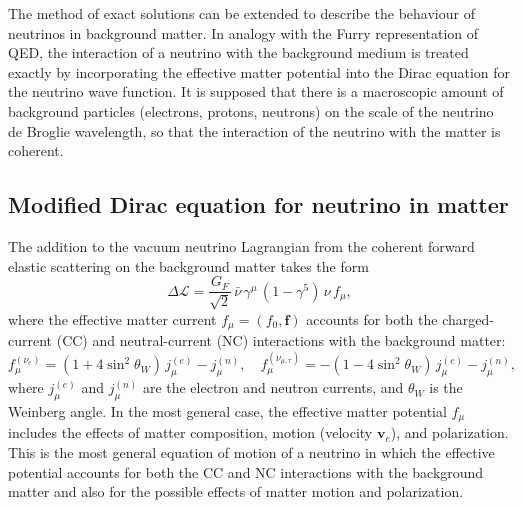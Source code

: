 \documentclass[a4paper,11pt]{article}
\begin{document}
The method of exact solutions can be extended to describe the behaviour of neutrinos in background matter. In analogy with the Furry representation of QED, the interaction of a neutrino with the background medium is treated exactly by incorporating the effective matter potential into the Dirac equation for the neutrino wave function. It is supposed that there is a macroscopic amount of background particles (electrons, protons, neutrons) on the scale of the neutrino de Broglie wavelength, so that the interaction of the neutrino with the matter is coherent.

\subsection{Modified Dirac equation for neutrino in matter}

The addition to the vacuum neutrino Lagrangian from the coherent forward elastic scattering on the background matter takes the form~\cite{Studenikin:Ternov:2005PLB,Studenikin:2006JPA}
\begin{equation}
\label{eq:delta_L}
\Delta \mathcal{L} = \frac{G_F}{\sqrt{2}}\,\bar{\nu}\,\gamma^\mu\,(1-\gamma^5)\,\nu\,f_\mu,
\end{equation}
where the effective matter current $f_\mu = (f_0, \mathbf{f})$ accounts for both the charged-current (CC) and neutral-current (NC) interactions with the background matter:
\begin{equation}
\label{eq:f_mu}
f_\mu^{(\nu_e)} = (1 + 4\sin^2\theta_W)\,j_\mu^{(e)} - j_\mu^{(n)}, \quad f_\mu^{(\nu_{\mu,\tau})} = -(1 - 4\sin^2\theta_W)\,j_\mu^{(e)} - j_\mu^{(n)},
\end{equation}
where $j_\mu^{(e)}$ and $j_\mu^{(n)}$ are the electron and neutron currents, and $\theta_W$ is the Weinberg angle. In the most general case, the effective matter potential $f_\mu$ includes the effects of matter composition, motion (velocity $\mathbf{v}_e$), and polarization. This is the most general equation of motion of a neutrino in which the effective potential accounts for both the CC and NC interactions with the background matter and also for the possible effects of matter motion and polarization.
\end{document}

